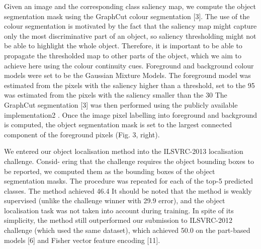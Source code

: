 Given an image and the corresponding class saliency map, we compute the object segmentation mask
using the GraphCut colour segmentation [3]. The use of the colour segmentation is motivated by the
fact that the saliency map might capture only the most discriminative part of an object, so saliency
thresholding might not be able to highlight the whole object. Therefore, it is important to be able
to propagate the thresholded map to other parts of the object, which we aim to achieve here using
the colour continuity cues. Foreground and background colour models were set to be the Gaussian
Mixture Models. The foreground model was estimated from the pixels with the saliency higher than
a threshold, set to the 95%
was estimated from the pixels with the saliency smaller than the 30%
The GraphCut segmentation [3] was then performed using the publicly available implementation2 .
Once the image pixel labelling into foreground and background is computed, the object segmentation
mask is set to the largest connected component of the foreground pixels (Fig. 3, right).

We entered our object localisation method into the ILSVRC-2013 localisation challenge. Consid-
ering that the challenge requires the object bounding boxes to be reported, we computed them as
the bounding boxes of the object segmentation masks. The procedure was repeated for each of the
top-5 predicted classes. The method achieved 46.4%
It should be noted that the method is weakly supervised (unlike the challenge winner with 29.9%
error), and the object localisation task was not taken into account during training. In spite of its
simplicity, the method still outperformed our submission to ILSVRC-2012 challenge (which used
the same dataset), which achieved 50.0%
on the part-based models [6] and Fisher vector feature encoding [11].

